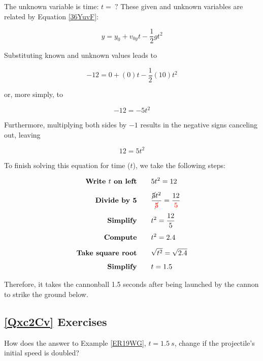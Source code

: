 \documentclass[main-physics.tex]{subfiles}
\begin{document}
The unknown variable is time: $t =\ ?$ These given and unknown variables are related by Equation \eqref{36YuvF}:

\begin{equation*}
    y = y_0 + v_{0y}t - \frac{1}{2}  g t^2 
\end{equation*}

Substituting known and unknown values leads to

\begin{equation*}
    -12 = 0 + (0) t - \frac{1}{2} (10) t^2
\end{equation*}

or, more simply, to

\begin{equation*}
    -12 = -5 t^2
\end{equation*}

Furthermore, multiplying both sides by $-1$ results in the negative signs canceling out, leaving

\begin{equation*}
    12 = 5 t^2
\end{equation*}

To finish solving this equation for time ($t$), we take the following steps:

\begin{align*}
    \textbf{Write $t$ on left} \qquad & 5 t^2 = 12\\[1ex]
    \textbf{Divide by 5} \qquad & \frac{\cancel{5} t^2}{\textcolor{red}{\cancel{5}}} = \frac{12}{\textcolor{red}{5}}\\[1ex]
    \textbf{Simplify} \qquad & t^2 = \frac{12}{5}\\[1ex]
    \textbf{Compute} \qquad & t^2 = 2.4\\[1ex]
    \textbf{Take square root} \qquad & \sqrt{t^2} = \sqrt{2.4}\\[1ex]
    \textbf{Simplify} \qquad & t = 1.5
\end{align*}

Therefore, it takes the cannonball 1.5 seconds after being launched by the cannon to strike the ground below. 

\endsolution

\subsection*{\ref{Qxc2Cv} Exercises}

\begin{exercise} \label{ADuHT8}
    How does the answer to Example \ref{ER19WG}, $t=\SI{1.5}{s}$, change if the projectile's initial speed is doubled?
\end{exercise}
\end{document}
